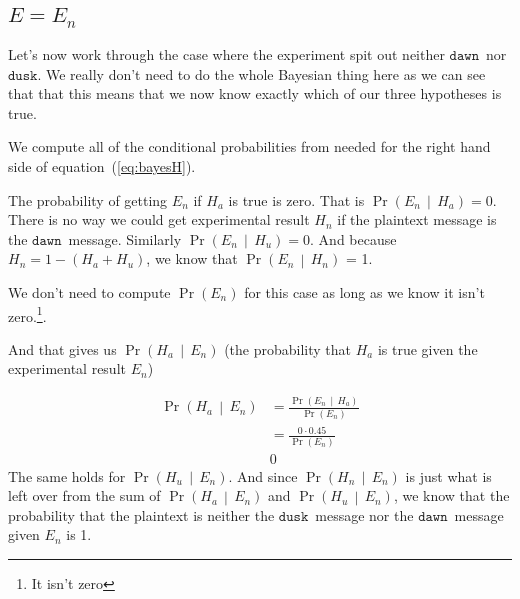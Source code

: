\documentclass[11pt]{article}
\newcommand{\prob}[1]{\ensuremath{\operatorname{Pr}\left( #1 \right)}}
\newcommand{\condprob}[2]{\prob{#1\, \middle|\, #2}}
\newcommand\mdusk{\ensuremath{\mathtt{dusk}}}
\newcommand\mdawn{\ensuremath{\mathtt{dawn}}}
\begin{document}
\subsection{\(E = E_n\)}

Let's now work through the case where the experiment spit out neither \mdawn\ nor \mdusk. We really don't need to do the whole Bayesian thing here as we can see that that this means that we now know exactly which of our three hypotheses is true. 


We compute all of the conditional probabilities from needed for the right hand side of equation~(\ref{eq:bayesH}).


The probability of getting $E_n$ if $H_a$ is true is zero. That is
$\condprob{E_n}{H_a} = 0$.
There is no way we could get experimental result $H_n$ if the plaintext message is the \mdawn\ message.
Similarly 
$\condprob{E_n}{H_u} = 0$.
And because $H_n = 1 - (H_a + H_u)$, we know that $\condprob{E_n}{H_n}$ = 1.

We don't need to compute \prob{E_n} for this case as long as we know it isn't zero.\footnote{It isn't zero}.

And that gives us \condprob{H_a}{E_n} (the probability that $H_a$ is true given the experimental result $E_n$)

\begin{align*}
    \condprob{H_a}{E_n} &= \frac{\condprob{E_n}{H_a}}{\prob{E_n}} \\
                        &= \frac{0 \cdot 0.45}{\prob{E_n}} \\
                        & 0 
\end{align*}
The same holds for $\condprob{H_u}{E_n}$. And since $\condprob{H_n}{E_n}$ is just what is left over from the sum of  $\condprob{H_a}{E_n}$ and $\condprob{H_u}{E_n}$, we know that the probability that the plaintext is neither the \mdusk\ message nor the \mdawn\ message given $E_n$ is 1.
\end{document}
